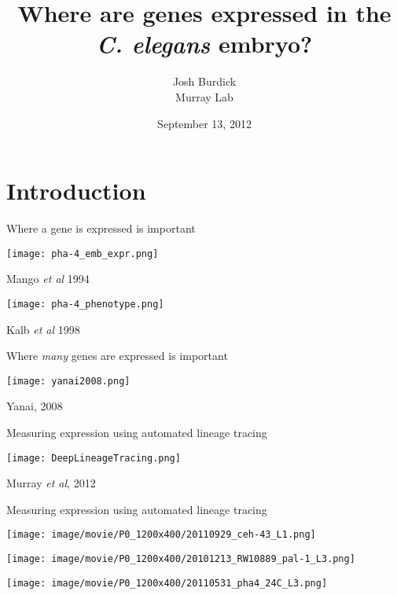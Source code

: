 \documentclass[serif,9pt]{beamer}
\title{Where are genes expressed in the {\em C. elegans} embryo?}
\author{Josh Burdick \\ Murray Lab}
\date{September 13, 2012}
\begin{document}
\begin{frame}
\titlepage
\end{frame}

\begin{frame}
\tableofcontents
\end{frame}

\section{Introduction}

\begin{frame}{Where a gene is expressed is important}

\begin{minipage}{0.27\textwidth}
\texttt{[image: pha-4\_emb\_expr.png]}

\hfill {\footnotesize Mango {\em et al} 1994}
\end{minipage}
\pause
\hspace{0.01\textwidth}
\begin{minipage}{0.7\textwidth}
\texttt{[image: pha-4\_phenotype.png]}

\hfill {\footnotesize Kalb {\em et al} 1998}
\end{minipage}

\end{frame}

\begin{frame}{Where {\em many} genes are expressed is important}

\texttt{[image: yanai2008.png]}

\hfill Yanai, 2008

\end{frame}

\begin{frame}{Measuring expression using automated lineage tracing}

\texttt{[image: DeepLineageTracing.png]}

\hfill Murray {\em et al}, 2012

\end{frame}

\begin{frame}{Measuring expression using automated lineage tracing}

{\center
\texttt{[image: image/movie/P0\_1200x400/20110929\_ceh-43\_L1.png]}

\texttt{[image: image/movie/P0\_1200x400/20101213\_RW10889\_pal-1\_L3.png]}

\texttt{[image: image/movie/P0\_1200x400/20110531\_pha4\_24C\_L3.png]}

}

\end{frame}
\end{document}
